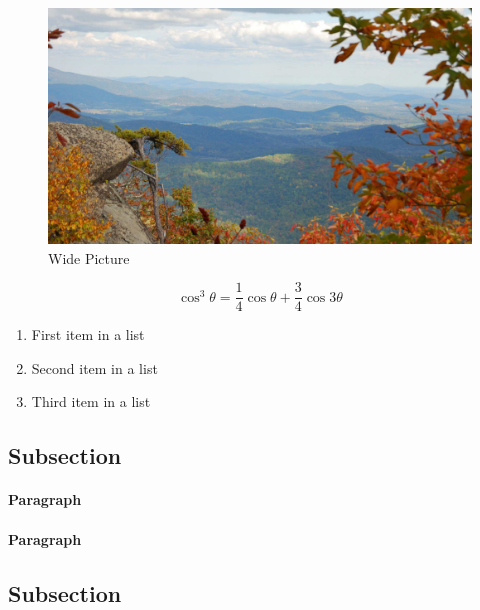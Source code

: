 \documentclass[fleqn,10pt]{SelfArx} %
\begin{document}
\begin{figure}[ht]\centering %
\includegraphics[width=\linewidth]{view}
\caption{Wide Picture}
\label{fig:view}
\end{figure}



\begin{equation}
\cos^3 \theta =\frac{1}{4}\cos\theta+\frac{3}{4}\cos 3\theta
\label{eq:refname2}
\end{equation}



\begin{enumerate}[noitemsep] %
\item First item in a list
\item Second item in a list
\item Third item in a list
\end{enumerate}

\subsection{Subsection}

\lipsum[6] %

\paragraph{Paragraph} \lipsum[7] %
\paragraph{Paragraph} \lipsum[8] %

\subsection{Subsection}
\end{document}
